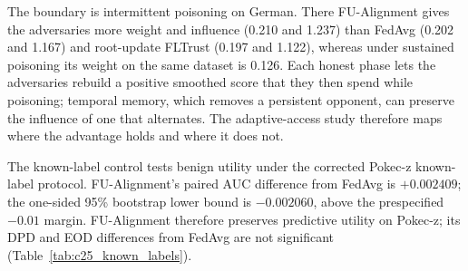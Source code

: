 The boundary is intermittent poisoning on German. There FU-Alignment gives the adversaries more weight and influence (0.210 and 1.237) than FedAvg (0.202 and 1.167) and root-update FLTrust (0.197 and 1.122), whereas under sustained poisoning its weight on the same dataset is 0.126. Each honest phase lets the adversaries rebuild a positive smoothed score that they then spend while poisoning; temporal memory, which removes a persistent opponent, can preserve the influence of one that alternates. The adaptive-access study therefore maps where the advantage holds and where it does not.





The known-label control tests benign utility under the corrected Pokec-z known-label protocol. FU-Alignment's paired AUC difference from FedAvg is $+0.002409$; the one-sided 95\% bootstrap lower bound is $-0.002060$, above the prespecified $-0.01$ margin. FU-Alignment therefore preserves predictive utility on Pokec-z; its DPD and EOD differences from FedAvg are not significant (Table~\ref{tab:c25_known_labels}).
